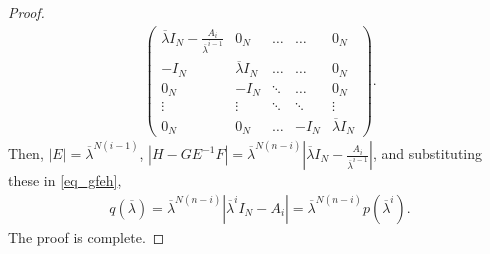 \documentclass[journal]{IEEEtran}
\begin{document}
\begin{proof}
\small \begin{align}
 \left( 
		\begin{array}{ccccc}
			\overline{\lambda} I_N-\frac{A_i}{\overline{\lambda}^{i-1}} & 0_N & \hdots & \hdots & 0_N \\
			-I_N &  \overline{\lambda} I_N & \hdots &\hdots & 0_N\\
			0_N &  -I_N & \ddots   &  \hdots   & 0_N  \\
			\vdots & \vdots & \ddots &  \ddots & \vdots \\
			0_N & 0_N &  \hdots & -I_N & \overline{\lambda} I_N
		\end{array}
		\right).
	\end{align} \normalsize
Then, $|E|= \overline{\lambda}^{N(i-1)}$, $ |H-GE^{-1}F|=\overline{\lambda}^{N(n-i)}|\overline{\lambda} I_N-\frac{A_i}{\overline{\lambda}^{i-1}}|$, and substituting these in \eqref{eq_gfeh},
\begin{align} 
		q(\overline{\lambda}) =  \overline{\lambda}^{N(n-i)}|\overline{\lambda}^i I_N - A_i| = \overline{\lambda}^{N(n-i)} p(\overline{\lambda}^i).
\end{align}
The proof is complete.
\end{proof}
\end{document}
